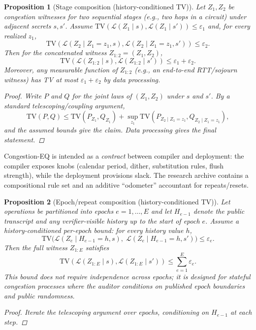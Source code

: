 \documentclass[11pt]{article}
\newtheorem{proposition}{Proposition}
\theoremstyle{definition}
\theoremstyle{remark}
\newcommand{\TV}{\mathrm{TV}}
\newcommand{\eps}{\varepsilon}
\begin{document}
\begin{proposition}[Stage composition (history-conditioned TV)]
Let $Z_1,Z_2$ be congestion witnesses for two sequential stages (e.g., two hops in a circuit) under adjacent secrets $s,s'$.
Assume $\TV(\mathcal{L}(Z_1\mid s),\mathcal{L}(Z_1\mid s'))\le \eps_1$ and, for every realized $z_1$,
\[
\TV(\mathcal{L}(Z_2\mid Z_1=z_1,s),\mathcal{L}(Z_2\mid Z_1=z_1,s'))\le \eps_2.
\]
Then for the concatenated witness $Z_{1:2}=(Z_1,Z_2)$,
\[
\TV(\mathcal{L}(Z_{1:2}\mid s),\mathcal{L}(Z_{1:2}\mid s')) \le \eps_1+\eps_2.
\]
Moreover, any measurable function of $Z_{1:2}$ (e.g., an end-to-end RTT/sojourn witness) has TV at most $\eps_1+\eps_2$ by data processing.

\begin{proof}
Write $P$ and $Q$ for the joint laws of $(Z_1,Z_2)$ under $s$ and $s'$.
By a standard telescoping/coupling argument,
\[
\TV(P,Q)\le \TV(P_{Z_1},Q_{Z_1}) + \sup_{z_1}\TV(P_{Z_2\mid Z_1=z_1},Q_{Z_2\mid Z_1=z_1}),
\]
and the assumed bounds give the claim.
Data processing gives the final statement.
\end{proof}
\end{proposition}

Congestion-EQ is intended as a \emph{contract} between compiler and deployment: the compiler exposes knobs (calendar period, dither, substitution rules, flush strength), while the deployment provisions slack.
The research archive contains a compositional rule set and an additive ``odometer'' accountant for repeats/resets.

\begin{proposition}[Epoch/repeat composition (history-conditioned TV)]\label{prop:epochcomp}
Let operations be partitioned into epochs $e=1,\dots,E$ and let $H_{e-1}$ denote the public transcript and any verifier-visible history up to the start of epoch $e$.
Assume a history-conditioned per-epoch bound: for every history value $h$,
\[
\TV\big(\mathcal{L}(Z_e\mid H_{e-1}=h, s),\;\mathcal{L}(Z_e\mid H_{e-1}=h, s')\big) \le \eps_e.
\]
Then the full witness $Z_{1:E}$ satisfies
\[
\TV(\mathcal{L}(Z_{1:E}\mid s),\mathcal{L}(Z_{1:E}\mid s')) \le \sum_{e=1}^E \eps_e.
\]
This bound does not require independence across epochs; it is designed for stateful congestion processes where the auditor conditions on published epoch boundaries and public randomness.

\begin{proof}
Iterate the telescoping argument over epochs, conditioning on $H_{e-1}$ at each step.
\end{proof}
\end{proposition}
\end{document}

